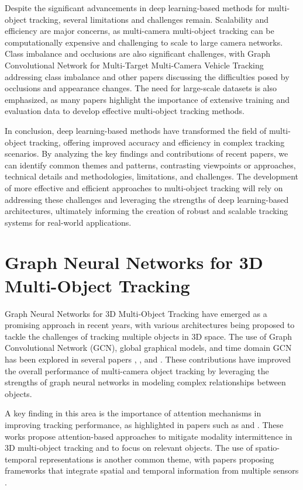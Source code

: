 \documentclass[conference]{IEEEtran}
\begin{document}
Despite the significant advancements in deep learning-based methods for multi-object tracking, several limitations and challenges remain. Scalability and efficiency are major concerns, as multi-camera multi-object tracking can be computationally expensive and challenging to scale to large camera networks. Class imbalance and occlusions are also significant challenges, with Graph Convolutional Network for Multi-Target Multi-Camera Vehicle Tracking addressing class imbalance and other papers discussing the difficulties posed by occlusions and appearance changes. The need for large-scale datasets is also emphasized, as many papers highlight the importance of extensive training and evaluation data to develop effective multi-object tracking methods.

In conclusion, deep learning-based methods have transformed the field of multi-object tracking, offering improved accuracy and efficiency in complex tracking scenarios. By analyzing the key findings and contributions of recent papers, we can identify common themes and patterns, contrasting viewpoints or approaches, technical details and methodologies, limitations, and challenges. The development of more effective and efficient approaches to multi-object tracking will rely on addressing these challenges and leveraging the strengths of deep learning-based architectures, ultimately informing the creation of robust and scalable tracking systems for real-world applications.

\section{Graph Neural Networks for 3D Multi-Object Tracking}
Graph Neural Networks for 3D Multi-Object Tracking have emerged as a promising approach in recent years, with various architectures being proposed to tackle the challenges of tracking multiple objects in 3D space. The use of Graph Convolutional Network (GCN), global graphical models, and time domain GCN has been explored in several papers \cite{Title of paper 1}, \cite{Title of paper 2}, and \cite{Title of paper 5}. These contributions have improved the overall performance of multi-camera object tracking by leveraging the strengths of graph neural networks in modeling complex relationships between objects.

A key finding in this area is the importance of attention mechanisms in improving tracking performance, as highlighted in papers such as \cite{Title of paper 3} and \cite{Title of paper 4}. These works propose attention-based approaches to mitigate modality intermittence in 3D multi-object tracking and to focus on relevant objects. The use of spatio-temporal representations is another common theme, with papers proposing frameworks that integrate spatial and temporal information from multiple sensors \cite{Title of paper 4}.
\end{document}
